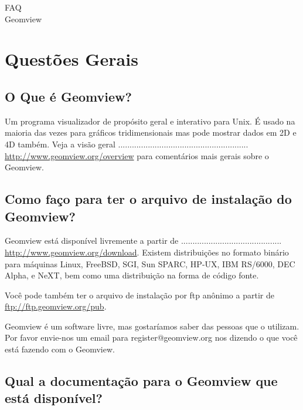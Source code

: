 \documentclass[12pt,a4paper]{article}
\begin{document}
\vspace*{6cm}
\huge
\begin{center}
FAQ\\
Geomview
\end{center}
\normalsize
\newpage
\tableofcontents
\newpage

\section{Quest\~oes Gerais}

    \subsection{O Que \'e Geomview?}

        Um programa visualizador de prop\'{o}sito geral e interativo para Unix. \'E usado
        na maioria das vezes para gr\'aficos tridimensionais mas pode mostrar dados em 2D e 4D tamb\'em. Veja
        a vis\~ao geral .........................................................\\ \url{http://www.geomview.org/overview} para coment\'arios mais
        gerais sobre o Geomview.

    \subsection{Como fa\c{c}o para ter o arquivo de instala\c{c}\~ao do Geomview?}

        Geomview est\'a dispon\'ivel livremente a partir de ............................................\\ \url{http://www.geomview.org/download}.
        Existem distribui\c{c}\~oes no formato bin\'ario para m\'aquinas Linux, FreeBSD, SGI, Sun SPARC,
        HP-UX, IBM RS/6000, DEC Alpha, e NeXT, bem como uma distribui\c{c}\~ao na forma de
        c\'{o}digo fonte.

        Voc\^e pode tamb\'em ter o arquivo de instala\c{c}\~ao por ftp an\^onimo a partir de \url{ftp://ftp.geomview.org/pub}.

        Geomview \'e um software livre, mas gostar\'iamos saber das pessoas que o utilizam.
        Por favor envie-nos um email para register@geomview.org nos dizendo o que
        voc\^e est\'a fazendo com o Geomview.

    \subsection{Qual a documenta\c{c}\~ao para o Geomview que est\'a dispon\'ivel?}
\end{document}

